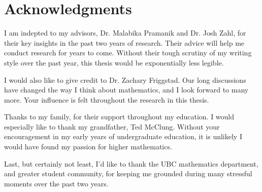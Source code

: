 
\chapter{Acknowledgments}

I am indepted to my advisors, Dr. Malabika Pramanik and Dr. Josh Zahl, for their key insights in the past two years of research. Their advice will help me conduct research for years to come. Without their tough scrutiny of my writing style over the past year, this thesis would be exponentially less legible.

I would also like to give credit to Dr. Zachary Friggstad. Our long discussions have changed the way I think about mathematics, and I look forward to many more. Your influence is felt throughout the research in this thesis.

Thanks to my family, for their support throughout my education. I would especially like to thank my grandfather, Ted McClung. Without your encouragement in my early years of undergraduate education, it is unlikely I would have found my passion for higher mathematics.

Last, but certainly not least, I'd like to thank the UBC mathematics department, and greater student community, for keeping me grounded during many stressful moments over the past two years.

